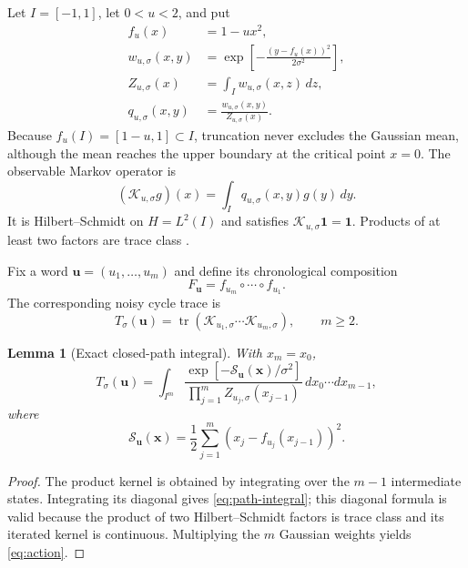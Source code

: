 \documentclass[11pt]{article}
\newtheorem{lemma}[theorem]{Lemma}
\theoremstyle{remark}
\DeclareMathOperator{\tr}{tr}
\newcommand{\cK}{\mathcal K}
\newcommand{\cS}{\mathcal S}
\newcommand{\bu}{\boldsymbol u}
\newcommand{\bx}{\boldsymbol x}
\newcommand{\one}{\mathbf 1}
\begin{document}
Let $I=[-1,1]$, let $0<u<2$, and put
\begin{align}
 f_u(x)&=1-u x^2,\label{eq:map}\\
 w_{u,\sigma}(x,y)&=
 \exp\left[-\frac{(y-f_u(x))^2}{2\sigma^2}\right],\\
 Z_{u,\sigma}(x)&=\int_Iw_{u,\sigma}(x,z)\,dz,\\
 q_{u,\sigma}(x,y)&=\frac{w_{u,\sigma}(x,y)}{Z_{u,\sigma}(x)}.
 \label{eq:kernel}
\end{align}
Because $f_u(I)=[1-u,1]\subset I$, truncation never excludes the Gaussian
mean, although the mean reaches the upper boundary at the critical point
$x=0$.  The observable Markov operator is
\begin{equation}
 (\cK_{u,\sigma}g)(x)=\int_Iq_{u,\sigma}(x,y)g(y)\,dy.
 \label{eq:operator}
\end{equation}
It is Hilbert--Schmidt on $H=L^2(I)$ and satisfies
$\cK_{u,\sigma}\one=\one$.  Products of at least two factors are trace class
\citep{Simon2005,Kress2014}.

Fix a word $\bu=(u_1,\ldots,u_m)$ and define its chronological composition
\begin{equation}
 F_{\bu}=f_{u_m}\circ\cdots\circ f_{u_1}.
 \label{eq:composition}
\end{equation}
The corresponding noisy cycle trace is
\begin{equation}
 T_\sigma(\bu)=
 \tr(\cK_{u_1,\sigma}\cdots\cK_{u_m,\sigma}),
 \qquad m\ge2.
 \label{eq:noisy-trace}
\end{equation}

\begin{lemma}[Exact closed-path integral]
\label{lem:path-integral}
With $x_m=x_0$,
\begin{equation}
 T_\sigma(\bu)=
 \int_{I^m}
 \frac{\exp[-\cS_{\bu}(\bx)/\sigma^2]}
 {\prod_{j=1}^m Z_{u_j,\sigma}(x_{j-1})}
 \,dx_0\cdots dx_{m-1},
 \label{eq:path-integral}
\end{equation}
where
\begin{equation}
 \cS_{\bu}(\bx)=\frac12\sum_{j=1}^{m}
 \left(x_j-f_{u_j}(x_{j-1})\right)^2.
 \label{eq:action}
\end{equation}
\end{lemma}

\begin{proof}
The product kernel is obtained by integrating over the $m-1$ intermediate
states.  Integrating its diagonal gives \eqref{eq:path-integral}; this diagonal
formula is valid because the product of two Hilbert--Schmidt factors is trace
class and its iterated kernel is continuous.  Multiplying the $m$ Gaussian
weights yields \eqref{eq:action}.
\end{proof}
\end{document}

